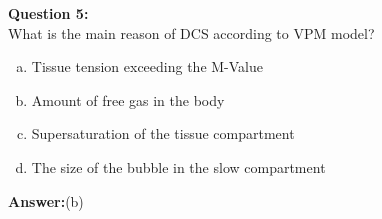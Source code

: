 \documentclass[aspectratio=1610,english,14pt]{beamer}
\begin{document}
\begin{frame}{\insertsubsection}  
	\textbf{Question 5:}\\
	What is the main reason of DCS according to VPM model?
	\begin{enumerate}[(a)]
		\item Tissue tension exceeding the M-Value
		\item Amount of free gas in the body
		\item Supersaturation of the tissue compartment
		\item The size of the bubble in the slow compartment
	\end{enumerate}
	\pause
	\textbf{Answer:}(b)
\end{frame}
\end{document}
